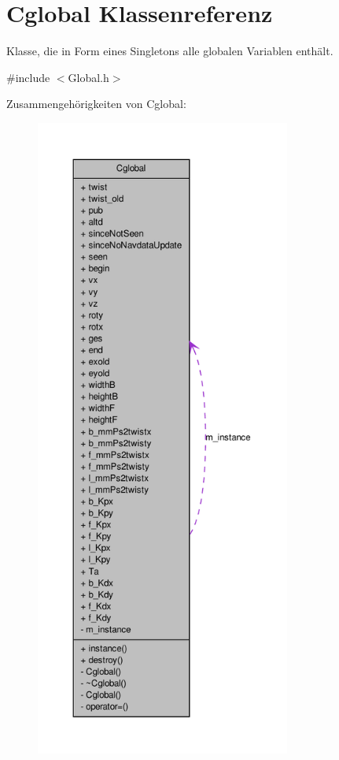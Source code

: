 \hypertarget{class_cglobal}{
\section{Cglobal Klassenreferenz}
\label{class_cglobal}
}


Klasse, die in Form eines Singletons alle globalen Variablen enthält.  




{\ttfamily \#include $<$Global.h$>$}



Zusammengehörigkeiten von Cglobal:\nopagebreak
\begin{figure}[H]
\begin{center}
\leavevmode
\includegraphics[height=600pt]{class_cglobal__coll__graph}
\end{center}
\end{figure}
